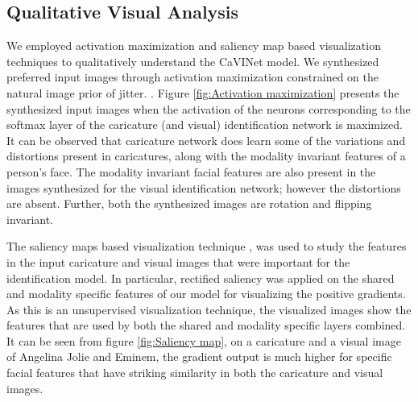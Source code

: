 \subsection{Qualitative Visual Analysis}
We employed activation maximization and saliency map based visualization techniques to qualitatively understand the CaVINet model. We synthesized preferred input images through activation maximization constrained on the natural image prior of jitter. \cite{vis4, vis6}. Figure \ref{fig:Activation maximization} presents the synthesized input images when the activation of the neurons corresponding to the softmax layer of the caricature (and visual) identification network is maximized. It can be observed that caricature network does learn some of the variations and distortions present in caricatures, along with the modality invariant features of a person's face. The modality invariant facial features are also present in the images synthesized for the visual identification network; however the distortions are absent. Further, both the synthesized images are rotation and flipping invariant.

The saliency maps based visualization technique \cite{Zeiler14visualizingand}, \cite{vis2} was used to study the features in the input caricature and visual images that were important for the identification model. In particular, rectified saliency was applied on the shared and modality specific features of our model for visualizing the positive gradients. As this is an unsupervised visualization technique, the visualized images show the features that are used by both the shared and modality specific layers combined. It can be seen from figure \ref{fig:Saliency map}, on a caricature and a visual image of Angelina Jolie and Eminem, the gradient output is much higher for specific facial features that have striking similarity in both the caricature and visual images.

